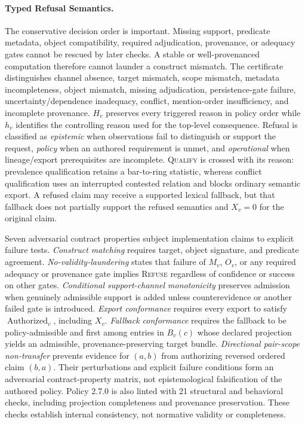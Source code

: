 \documentclass[manuscript,screen,review]{acmart}
\begin{document}
\paragraph{Typed Refusal Semantics.} The conservative decision order is important. Missing support, predicate metadata, object compatibility, required adjudication, provenance, or adequacy gates cannot be rescued by later checks. A stable or well-provenanced computation therefore cannot launder a construct mismatch. The certificate distinguishes channel absence, target mismatch, scope mismatch, metadata incompleteness, object mismatch, missing adjudication, persistence-gate failure, uncertainty/dependence inadequacy, conflict, mention-order insufficiency, and incomplete provenance. $H_v$ preserves every triggered reason in policy order while $h_v$ identifies the controlling reason used for the top-level consequence. Refusal is classified as \emph{epistemic} when observations fail to distinguish or support the request, \emph{policy} when an authored requirement is unmet, and \emph{operational} when lineage/export prerequisites are incomplete. \textsc{Qualify} is crossed with its reason: prevalence qualification retains a bar-to-ring statistic, whereas conflict qualification uses an interrupted contested relation and blocks ordinary semantic export. A refused claim may receive a supported lexical fallback, but that fallback does not partially support the refused semantics and $X_v=0$ for the original claim.

Seven adversarial contract properties subject implementation claims to explicit failure tests. \emph{Construct matching} requires target, object signature, and predicate agreement. \emph{No-validity-laundering} states that failure of $M_v$, $O_v$, or any required adequacy or provenance gate implies \textsc{Refuse} regardless of confidence or success on other gates. \emph{Conditional support-channel monotonicity} preserves admission when genuinely admissible support is added unless counterevidence or another failed gate is introduced. \emph{Export conformance} requires every export to satisfy $\operatorname{Authorized}_v$, including $X_v$. \emph{Fallback conformance} requires the fallback to be policy-admissible and first among entries in $B_v(c)$ whose declared projection yields an admissible, provenance-preserving target bundle. \emph{Directional pair-scope non-transfer} prevents evidence for $(a,b)$ from authorizing reversed ordered claim $(b,a)$. Their perturbations and explicit failure conditions form an adversarial contract-property matrix, not epistemological falsification of the authored policy. Policy 2.7.0 is also linted with 21 structural and behavioral checks, including projection completeness and provenance preservation. These checks establish internal consistency, not normative validity or completeness.
\end{document}
